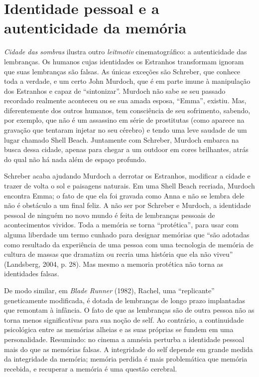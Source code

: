 \chapter*{Identidade pessoal e a autenticidade da memória}

\emph{Cidade das sombras} ilustra outro \emph{leitmotiv}
cinematográfico: a autenticidade das lembranças. Os humanos cujas
identidades os Estranhos transformam ignoram que suas lembranças são
falsas. As únicas exceções são Schreber, que conhece toda a verdade, e
um certo John Murdoch, que é em parte imune à manipulação dos Estranhos
e capaz de ``sintonizar''. Murdoch não sabe se seu passado recordado
realmente aconteceu ou se sua amada esposa, ``Emma'', existiu. Mas,
diferentemente dos outros humanos, tem consciência de seu sofrimento,
sabendo, por exemplo, que não é um assassino em série de prostitutas
(como aparece na gravação que tentaram injetar no seu cérebro) e tendo
uma leve saudade de um lugar chamado Shell Beach. Juntamente com
Schreber, Murdoch embarca na busca dessa cidade, apenas para chegar a um
outdoor em cores brilhantes, atrás do qual não há nada além de espaço
profundo.

Schreber acaba ajudando Murdoch a derrotar os Estranhos, modificar a
cidade e trazer de volta o sol e paisagens naturais. Em uma Shell Beach
recriada, Murdoch encontra Emma; o fato de que ela foi gravada como Anna
e não se lembra dele não é obstáculo a um final feliz. A não ser por
Schreber e Murdoch, a identidade pessoal de ninguém no novo mundo é
feita de lembranças pessoais de acontecimentos vividos. Toda a memória
se torna ``protética'', para usar com alguma liberdade um termo cunhado
para designar memórias que ``são adotadas como resultado da experiência
de uma pessoa com uma tecnologia de memória de cultura de massas que
dramatiza ou recria uma história que ela não viveu'' (Landsberg, 2004,
p. 28). Mas mesmo a memoria protética não torna as identidades falsas.

De modo similar, em \emph{Blade Runner} (1982), Rachel, uma
``replicante'' geneticamente modificada, é dotada de lembranças de longo
prazo implantadas que remontam à infância. O fato de que as lembranças
são de outra pessoa não as torna menos significativas para sua noção de
self. Ao contrário, a continuidade psicológica entre as memórias alheias
e as suas próprias se fundem em uma personalidade. Resumindo: no cinema
a amnésia perturba a identidade pessoal mais do que as memórias falsas.
A integridade do self depende em grande medida da integridade da
memória; memória perdida é mais problemática que memória recebida, e
recuperar a memória é uma questão cerebral.

